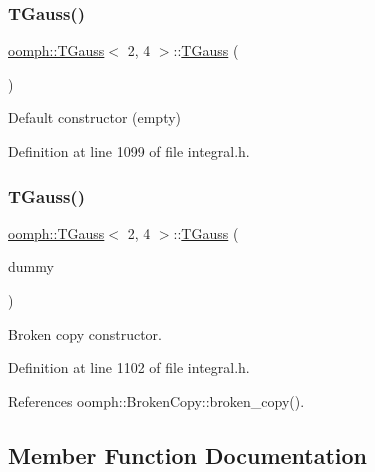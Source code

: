 \subsubsection{\texorpdfstring{T\+Gauss()}{TGauss()}\hspace{0.1cm}{\footnotesize\ttfamily [1/2]}}
{\footnotesize\ttfamily \hyperlink{classoomph_1_1TGauss}{oomph\+::\+T\+Gauss}$<$ 2, 4 $>$\+::\hyperlink{classoomph_1_1TGauss}{T\+Gauss} (\begin{DoxyParamCaption}{ }\end{DoxyParamCaption})\hspace{0.3cm}{\ttfamily [inline]}}



Default constructor (empty) 



Definition at line 1099 of file integral.\+h.

\mbox{\label{classoomph_1_1TGauss_3_012_00_014_01_4_a13082b1b17e3d129557b3e255b36536e}} 
\subsubsection{\texorpdfstring{T\+Gauss()}{TGauss()}\hspace{0.1cm}{\footnotesize\ttfamily [2/2]}}
{\footnotesize\ttfamily \hyperlink{classoomph_1_1TGauss}{oomph\+::\+T\+Gauss}$<$ 2, 4 $>$\+::\hyperlink{classoomph_1_1TGauss}{T\+Gauss} (\begin{DoxyParamCaption}\item[{const \hyperlink{classoomph_1_1TGauss}{T\+Gauss}$<$ 2, 4 $>$ \&}]{dummy }\end{DoxyParamCaption})\hspace{0.3cm}{\ttfamily [inline]}}



Broken copy constructor. 



Definition at line 1102 of file integral.\+h.



References oomph\+::\+Broken\+Copy\+::broken\+\_\+copy().



\subsection{Member Function Documentation}
\mbox{\label{classoomph_1_1TGauss_3_012_00_014_01_4_aad773b089d5341ed25bc47f60b7572aa}} 
